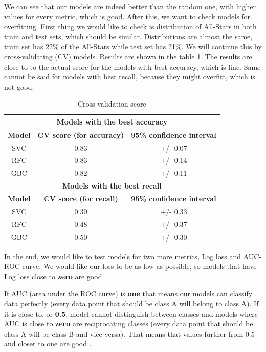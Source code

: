 \documentclass[a4paper]{article}
\begin{document}
We can see that our models are indeed better than the random one, with higher values for  every metric, which is good. After this, we want to check models for overfitting. First thing we would like to check is distribution of All-Stars in both train and test sets, which should be similar. Distributions are almost the same, train set has 22\% of the All-Stars while test set has 21\%. We will continue this by cross-validating (CV) models. Results are shown in the table \ref{tab:cross_val_all_star}. The results are close to to the actual score for the models with best accuracy, which is fine. Same cannot be said for models with best recall, because they might overfitt, which is not good.

\begin{table}[!h]
\begin{center}
\begin{tabular}{|c|c|c|} \hline
\multicolumn{3}{|c|}{\textbf{Models with the best accuracy}} \\ \hline
\textbf{Model} & \textbf{CV score (for accuracy)} & \textbf{95\% confidence interval} \\ \hline
SVC & 0.83 & +/- 0.07 \\ \hline
RFC & 0.83 & +/- 0.14 \\ \hline
GBC & 0.82 & +/- 0.11 \\ \hline
\multicolumn{3}{|c|}{\textbf{Models with the best recall}} \\ \hline
\textbf{Model} & \textbf{CV score (for recall)} & \textbf{95\% confidence interval} \\ \hline
SVC & 0.30 & +/- 0.33 \\ \hline
RFC & 0.48 & +/- 0.37 \\ \hline
GBC & 0.50 & +/- 0.30 \\ \hline
\end{tabular}
\caption{Cross-validation score}
\label{tab:cross_val_all_star}
\end{center}
\end{table}

In the end, we would like to test models for two more metrics, Log loss and AUC-ROC curve. We would like our loss to be as low as possible, so models that have Log loss close to \textbf{zero} are good. \cite{logLoss} 

If AUC (area under the ROC curve) is \textbf{one} that means our models can classify data perfectly (every data point that should be class A will belong to class A). If it is close to, or \textbf{0.5}, model cannot distinguish between classes and models where AUC is close to \textbf{zero} are reciprocating classes (every data point that should be class A will be class B and vice versa). That means that values further from 0.5 and closer to one are good \cite{aucRoc}.
\end{document}
